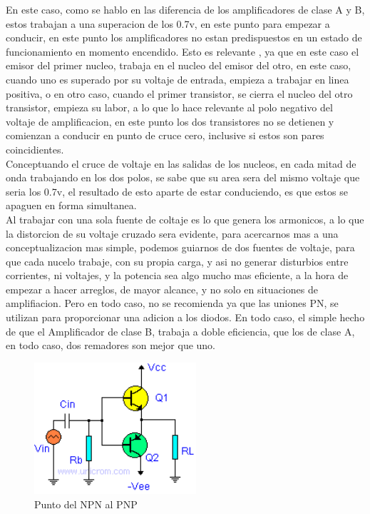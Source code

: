 \documentclass[12pt,a4paper]{article}
\begin{document}
En este caso, como se hablo en las diferencia de los amplificadores de clase A y B, estos trabajan a una superacion de los 0.7v, en este punto para empezar a conducir, en este punto los amplificadores no estan predispuestos en un estado de funcionamiento en momento encendido. Esto es relevante , ya que en este caso el emisor del primer nucleo, trabaja en el nucleo del emisor del otro, en este caso, cuando uno es superado por su voltaje de entrada, empieza a trabajar en linea positiva, o en otro caso, cuando el primer transistor, se cierra el nucleo del otro transistor, empieza su labor, a lo que lo hace relevante al polo negativo del voltaje de amplificacion, en este punto los dos transistores no se detienen y comienzan a conducir en punto de cruce cero, inclusive si estos son pares coincidientes.\\

Conceptuando el cruce de voltaje en las salidas de los nucleos, en cada mitad de onda trabajando en los dos polos, se sabe que su area sera del mismo voltaje que seria los 0.7v, el resultado de esto aparte de estar conduciendo, es que estos se apaguen en forma simultanea.\\

Al trabajar con una sola fuente de coltaje es lo que genera los armonicos, a lo que la distorcion de su voltaje cruzado sera evidente, para acercarnos mas a una conceptualizacion mas simple, podemos guiarnos de dos fuentes de voltaje, para que cada nucelo trabaje, con su propia carga, y asi no generar disturbios entre corrientes, ni voltajes, y la potencia sea algo mucho mas eficiente, a la hora de empezar a hacer arreglos, de mayor alcance, y no solo en situaciones de amplifiacion. Pero en todo caso, no se recomienda ya que las uniones PN, se utilizan para proporcionar una adicion a los diodos. En todo caso, el simple hecho de que el Amplificador de clase B, trabaja a doble eficiencia, que los de clase A, en todo caso, dos remadores son mejor que uno.\\

\begin{figure}[hbtp]
\centering
\includegraphics[width=6cm]{3.png}
\caption{Punto del NPN al PNP}
\end{figure}
\end{document}
